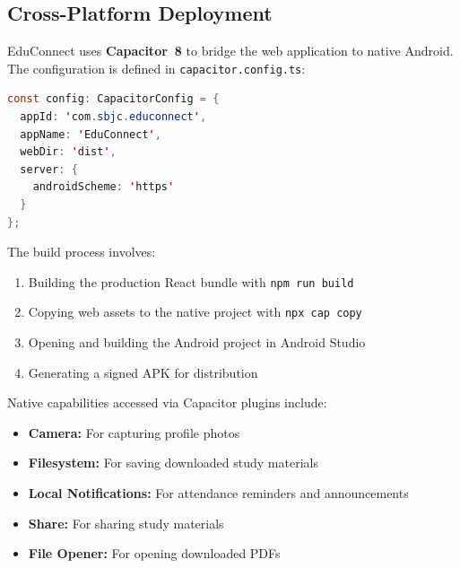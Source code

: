 \subsection{Cross-Platform Deployment}

EduConnect uses \textbf{Capacitor~8} to bridge the web application to native Android. The configuration is defined in \texttt{capacitor.config.ts}:

\begin{lstlisting}[language=Java, caption={Capacitor Configuration}]
const config: CapacitorConfig = {
  appId: 'com.sbjc.educonnect',
  appName: 'EduConnect',
  webDir: 'dist',
  server: {
    androidScheme: 'https'
  }
};
\end{lstlisting}

The build process involves:
\begin{enumerate}[label=\arabic*., leftmargin=2em]
    \item Building the production React bundle with \texttt{npm run build}
    \item Copying web assets to the native project with \texttt{npx cap copy}
    \item Opening and building the Android project in Android Studio
    \item Generating a signed APK for distribution
\end{enumerate}

Native capabilities accessed via Capacitor plugins include:
\begin{itemize}[leftmargin=2em]
    \item \textbf{Camera:} For capturing profile photos
    \item \textbf{Filesystem:} For saving downloaded study materials
    \item \textbf{Local Notifications:} For attendance reminders and announcements
    \item \textbf{Share:} For sharing study materials
    \item \textbf{File Opener:} For opening downloaded PDFs
\end{itemize}
